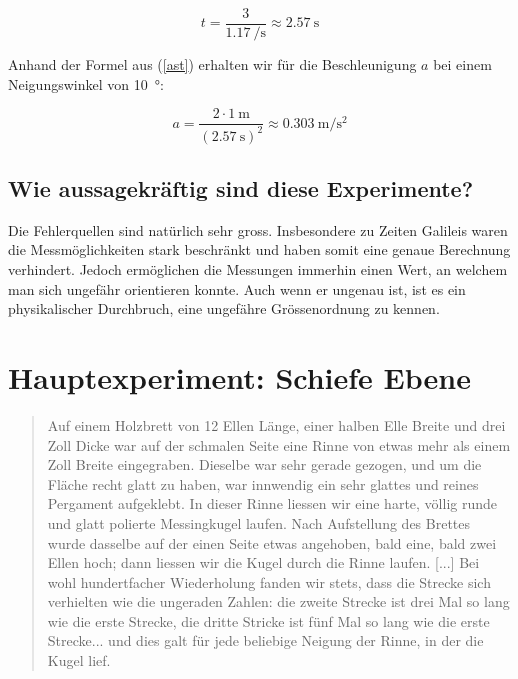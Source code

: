 \documentclass[a4paper, titlepage]{article}
\newcommand{\accunit}[1]{\SI{#1}{\metre\per\square\second}}
\begin{document}
    \begin{equation}
        t = \frac{3}{\SI{1.17}{\per\second}} \approx \SI{2.57}{\second}
    \end{equation}

    Anhand der Formel aus (\ref{ast}) erhalten wir für die Beschleunigung $a$
    bei einem Neigungswinkel von \SI{10}{\degree}:

    \begin{equation}
        a = \frac{2 \cdot \SI{1}{\metre}}{(\SI{2.57}{\second})^2} \approx \accunit{0.303}
    \end{equation}
    
    \subsection{Wie aussagekräftig sind diese Experimente?}
    Die Fehlerquellen sind natürlich sehr gross. Insbesondere zu Zeiten 
    Galileis waren die Messmöglichkeiten stark beschränkt und haben somit
    eine genaue Berechnung verhindert. Jedoch ermöglichen die Messungen
    immerhin einen Wert, an welchem man sich ungefähr orientieren konnte.
    Auch wenn er ungenau ist, ist es ein physikalischer Durchbruch, eine
    ungefähre Grössenordnung zu kennen.


    \section{Hauptexperiment: Schiefe Ebene}

    \begin{quote}
    Auf einem Holzbrett von 12 Ellen Länge, einer halben Elle Breite
    und drei Zoll Dicke war auf der schmalen Seite eine Rinne von
    etwas mehr als einem Zoll Breite eingegraben. Dieselbe war sehr
    gerade gezogen, und um die Fläche recht glatt zu haben, war
    innwendig ein sehr glattes und reines Pergament aufgeklebt.
    In dieser Rinne liessen wir eine harte, völlig runde und glatt
    polierte Messingkugel laufen. Nach Aufstellung des Brettes
    wurde dasselbe auf der einen Seite etwas angehoben,
    bald eine, bald zwei Ellen hoch; dann liessen wir die Kugel durch die
    Rinne laufen. [...] 
    Bei wohl hundertfacher Wiederholung fanden wir stets, 
    dass die Strecke sich verhielten wie die ungeraden Zahlen: 
    die zweite Strecke ist drei Mal so lang wie die erste Strecke, 
    die dritte Stricke ist fünf Mal so lang wie die erste Strecke... 
    und dies galt für jede beliebige Neigung der Rinne, in der die Kugel 
    lief. \cite{physicsbook}
    \end{quote}
\end{document}
